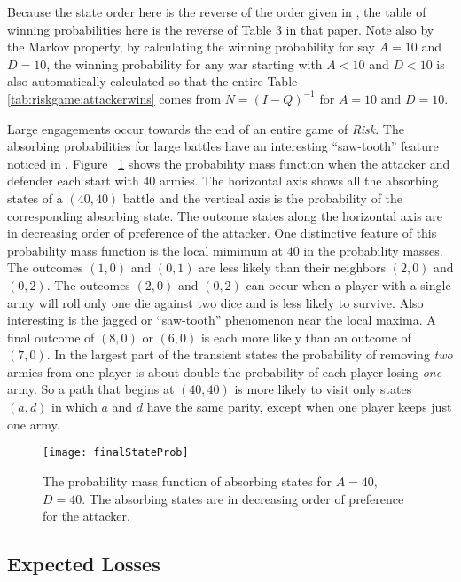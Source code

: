 \documentclass[12pt]{article}
\begin{document}
Because the state order here is the reverse of the order given in
\cite{osborne03}, the table of winning probabilities here is the reverse
of Table 3 in that paper.  Note also by the Markov property, by
calculating the winning probability for say \( A = 10 \) and \( D=10 \),
the winning probability for any war starting with \( A < 10 \) and \( D
< 10 \) is also automatically calculated so that the entire Table~%
\ref{tab:riskgame:attackerwins} comes from \( N = (I-Q)^{-1} \) for \( A
= 10 \) and \( D = 10 \).

Large engagements occur towards the end of an entire game of \emph{Risk}.
The absorbing probabilities for large battles have an interesting
``saw-tooth'' feature noticed in
\cite{pierce15}.  Figure~%
\ref{fig:riskgame:finalstateprob} shows the probability mass function
when the attacker and defender each start with \( 40 \) armies.  The
horizontal axis shows all the absorbing states of a \( (40,40) \) battle
and the vertical axis is the probability of the corresponding absorbing
state.  The outcome states along the horizontal axis are in decreasing
order of preference of the attacker.  One distinctive feature of this
probability mass function is the local mimimum at \( 40 \) in the
probability masses. The outcomes \( (1,0) \) and \( (0,1) \) are less
likely than their neighbors \( (2,0) \) and \( (0,2) \).  The outcomes \(
(2,0) \) and \( (0,2) \) can occur when a player with a single army will
roll only one die against two dice and is less likely to survive.  Also
interesting is the jagged or ``saw-tooth'' phenomenon near the local
maxima.  A final outcome of \( (8,0) \) or \( (6,0) \) is each more
likely than an outcome of \( (7,0) \).  In the largest part of the
transient states the probability of removing \emph{two} armies from one
player is about double the probability of each player losing \emph{one}
army.  So a path that begins at \( (40,40) \) is more likely to visit
only states \( (a,d) \) in which \( a \) and \( d \) have the same
parity, except when one player keeps just one army.

\begin{figure}
    \centering
    \texttt{[image: finalStateProb]}
    \caption{The probability mass function of absorbing states for \( A
    = 40 \), \( D = 40 \).  The absorbing states are in decreasing order
    of preference for the attacker.}%
    \label{fig:riskgame:finalstateprob}
\end{figure}

\subsection*{Expected Losses}
\end{document}
